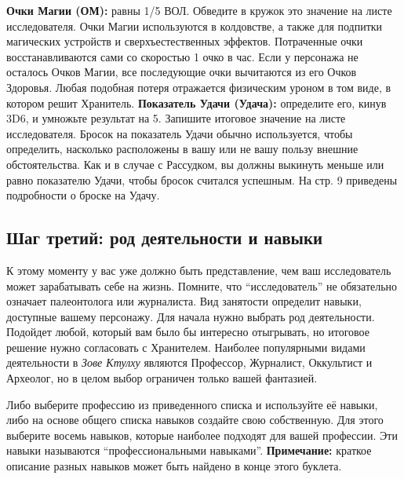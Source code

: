 \documentclass[letterpaper,twocolumn,openany, twoside, 11pt, usenames]{cocbook}
\begin{document}
\noindent \textbf{Очки Магии (ОМ):} равны 1/5 ВОЛ. Обведите в кружок это значение на листе исследователя. Очки Магии используются в колдовстве, а также для подпитки магических устройств и сверхъестественных эффектов. Потраченные очки восстанавливаются сами со скоростью 1 очко в час. Если у персонажа не осталось Очков Магии, все последующие очки вычитаются из его Очков Здоровья. Любая подобная потеря отражается физическим уроном в том виде, в котором решит Хранитель.
\smallbreak
\noindent {}
\smallbreak
\noindent \textbf{Показатель Удачи (Удача):} определите его, кинув 3D6, и умножьте результат на 5. Запишите итоговое значение на листе исследователя. Бросок на показатель Удачи обычно используется, чтобы определить, насколько расположены в вашу или не вашу пользу внешние обстоятельства. Как и в случае с Рассудком, вы должны выкинуть меньше или равно показателю Удачи, чтобы бросок считался успешным. На стр. 9 приведены подробности о броске на Удачу.
\smallbreak
\noindent {}

\subsection*{Шаг третий: род деятельности и навыки}

К этому моменту у вас уже должно быть представление, чем ваш исследователь может зарабатывать себе на жизнь. Помните, что ``исследователь'' не обязательно означает палеонтолога или журналиста. Вид занятости определит навыки, доступные вашему персонажу. Для начала нужно выбрать род деятельности. Подойдет любой, который вам было бы интересно отыгрывать, но итоговое решение нужно согласовать с Хранителем. Наиболее популярными видами деятельности в {\it Зове Ктулху} являются Профессор, Журналист, Оккультист и Археолог, но в целом выбор ограничен только вашей фантазией.

Либо выберите профессию из приведенного списка и используйте её навыки, либо на основе общего списка навыков создайте свою собственную. Для этого выберите восемь навыков, которые наиболее подходят для вашей профессии. Эти навыки называются ``профессиональными навыками''.
\smallbreak
\noindent \textbf{Примечание:} краткое описание разных навыков может быть найдено в конце этого буклета.
\smallbreak
\end{document}
